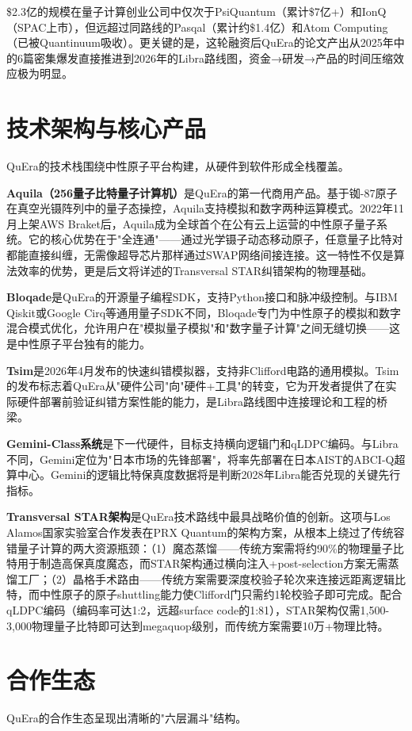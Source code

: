 \documentclass[11pt,a4paper]{ctexart}
\begin{document}
\$2.3亿的规模在量子计算创业公司中仅次于PsiQuantum（累计\$7亿+）和IonQ（SPAC上市），但远超过同路线的Pasqal（累计约\$1.4亿）和Atom Computing（已被Quantinuum吸收）。更关键的是，这轮融资后QuEra的论文产出从2025年中的6篇密集爆发直接推进到2026年的Libra路线图，资金→研发→产品的时间压缩效应极为明显。

\section{技术架构与核心产品}
QuEra的技术栈围绕中性原子平台构建，从硬件到软件形成全栈覆盖。

\textbf{Aquila（256量子比特量子计算机）}是QuEra的第一代商用产品。基于铷-87原子在真空光镊阵列中的量子态操控，Aquila支持模拟和数字两种运算模式。2022年11月上架AWS Braket后，Aquila成为全球首个在公有云上运营的中性原子量子系统。它的核心优势在于"全连通"——通过光学镊子动态移动原子，任意量子比特对都能直接纠缠，无需像超导芯片那样通过SWAP网络间接连接。这一特性不仅是算法效率的优势，更是后文将详述的Transversal STAR纠错架构的物理基础。

\textbf{Bloqade}是QuEra的开源量子编程SDK，支持Python接口和脉冲级控制。与IBM Qiskit或Google Cirq等通用量子SDK不同，Bloqade专门为中性原子的模拟和数字混合模式优化，允许用户在"模拟量子模拟"和"数字量子计算"之间无缝切换——这是中性原子平台独有的能力。

\textbf{Tsim}是2026年4月发布的快速纠错模拟器，支持非Clifford电路的通用模拟。Tsim的发布标志着QuEra从"硬件公司"向"硬件+工具"的转变，它为开发者提供了在实际硬件部署前验证纠错方案性能的能力，是Libra路线图中连接理论和工程的桥梁。

\textbf{Gemini-Class系统}是下一代硬件，目标支持横向逻辑门和qLDPC编码。与Libra不同，Gemini定位为"日本市场的先锋部署"，将率先部署在日本AIST的ABCI-Q超算中心。Gemini的逻辑比特保真度数据将是判断2028年Libra能否兑现的关键先行指标。

\textbf{Transversal STAR架构}是QuEra技术路线中最具战略价值的创新。这项与Los Alamos国家实验室合作发表在PRX Quantum的架构方案，从根本上绕过了传统容错量子计算的两大资源瓶颈：（1）魔态蒸馏——传统方案需将约90\%的物理量子比特用于制造高保真度魔态，而STAR架构通过横向注入+post-selection方案无需蒸馏工厂；（2）晶格手术路由——传统方案需要深度校验子轮次来连接远距离逻辑比特，而中性原子的原子shuttling能力使Clifford门只需约1轮校验子即可完成。配合qLDPC编码（编码率可达1:2，远超surface code的1:81），STAR架构仅需1,500-3,000物理量子比特即可达到megaquop级别，而传统方案需要10万+物理比特。

\section{合作生态}
QuEra的合作生态呈现出清晰的"六层漏斗"结构。
\end{document}
